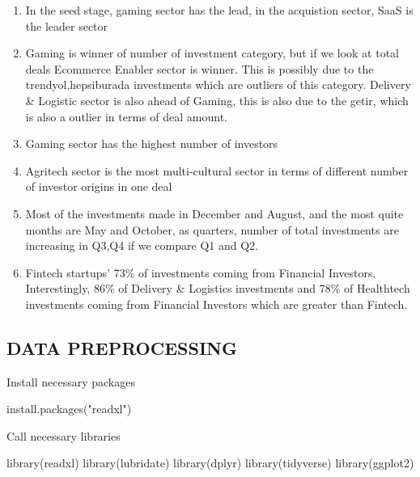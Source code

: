 \documentclass[
  letterpaper,
  DIV=11,
  numbers=noendperiod]{scrreprt}
\newenvironment{Shaded}{\begin{snugshade}}{\end{snugshade}}
\newcommand{\FunctionTok}[1]{\textcolor[rgb]{0.28,0.35,0.67}{#1}}
\newcommand{\NormalTok}[1]{\textcolor[rgb]{0.00,0.23,0.31}{#1}}
\newcommand{\StringTok}[1]{\textcolor[rgb]{0.13,0.47,0.30}{#1}}
\providecommand{\tightlist}{%
  \setlength{\itemsep}{0pt}\setlength{\parskip}{0pt}}\usepackage{longtable,booktabs,array}
\begin{document}
\begin{enumerate}
\def\labelenumi{\arabic{enumi}.}
\tightlist
\item
  In the seed stage, gaming sector has the lead, in the acquistion
  sector, SaaS is the leader sector
\item
  Gaming is winner of number of investment category, but if we look at
  total deals Ecommerce Enabler sector is winner. This is possibly due
  to the trendyol,hepsiburada investments which are outliers of this
  category. Delivery \& Logistic sector is also ahead of Gaming, this is
  also due to the getir, which is also a outlier in terms of deal
  amount.
\item
  Gaming sector has the highest number of investors
\item
  Agritech sector is the most multi-cultural sector in terms of
  different number of investor origins in one deal
\item
  Most of the investments made in December and August, and the most
  quite months are May and October, as quarters, number of total
  investments are increasing in Q3,Q4 if we compare Q1 and Q2.
\item
  Fintech startups' 73\% of investments coming from Financial Investors.
  Interestingly, 86\% of Delivery \& Logistics investments and 78\% of
  Healthtech investments coming from Financial Investors which are
  greater than Fintech.
\end{enumerate}

\hypertarget{data-preprocessing}{%
\subsection{DATA PREPROCESSING}\label{data-preprocessing}}

Install necessary packages

\begin{Shaded}
\begin{Highlighting}[]
\FunctionTok{install.packages}\NormalTok{(}\StringTok{"readxl"}\NormalTok{)}
\end{Highlighting}
\end{Shaded}

Call necessary libraries

\begin{Shaded}
\begin{Highlighting}[]
\FunctionTok{library}\NormalTok{(readxl)}
\FunctionTok{library}\NormalTok{(lubridate)}
\FunctionTok{library}\NormalTok{(dplyr)}
\FunctionTok{library}\NormalTok{(tidyverse)}
\FunctionTok{library}\NormalTok{(ggplot2)}
\end{Highlighting}
\end{Shaded}
\end{document}
